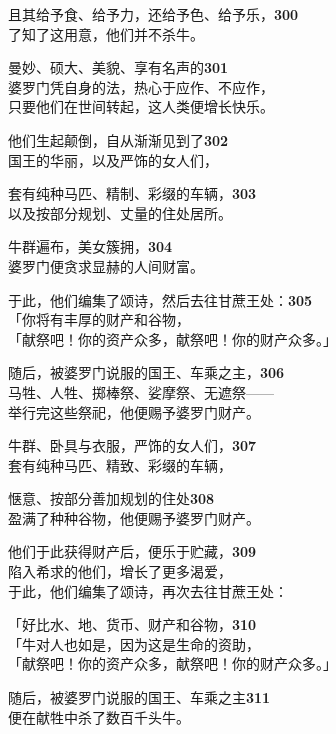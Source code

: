且其给予食、给予力，还给予色、给予乐，\hfill{\grayfootnotesize \textbf{300}} \\
了知了这用意，他们并不杀牛。


曼妙、硕大、美貌、享有名声的\hfill{\grayfootnotesize \textbf{301}} \\
婆罗门凭自身的法，热心于应作、不应作，\\
只要他们在世间转起，这人类便增长快乐。


他们生起颠倒，自从渐渐见到了\hfill{\grayfootnotesize \textbf{302}} \\
国王的华丽，以及严饰的女人们，


套有纯种马匹、精制、彩缀的车辆，\hfill{\grayfootnotesize \textbf{303}} \\
以及按部分规划、丈量的住处居所。


牛群遍布，美女簇拥，\hfill{\grayfootnotesize \textbf{304}} \\
婆罗门便贪求显赫的人间财富。


于此，他们编集了颂诗，然后去往甘蔗王处：\hfill{\grayfootnotesize \textbf{305}} \\
「你将有丰厚的财产和谷物，\\
「献祭吧！你的资产众多，献祭吧！你的财产众多。」


随后，被婆罗门说服的国王、车乘之主，\hfill{\grayfootnotesize \textbf{306}} \\
马牲、人牲、掷棒祭、娑摩祭、无遮祭——\\
举行完这些祭祀，他便赐予婆罗门财产。


牛群、卧具与衣服，严饰的女人们，\hfill{\grayfootnotesize \textbf{307}} \\
套有纯种马匹、精致、彩缀的车辆，


惬意、按部分善加规划的住处\hfill{\grayfootnotesize \textbf{308}} \\
盈满了种种谷物，他便赐予婆罗门财产。

他们于此获得财产后，便乐于贮藏，\hfill{\grayfootnotesize \textbf{309}} \\
陷入希求的他们，增长了更多渴爱，\\
于此，他们编集了颂诗，再次去往甘蔗王处：


「好比水、地、货币、财产和谷物，\hfill{\grayfootnotesize \textbf{310}} \\
「牛对人也如是，因为这是生命的资助，\\
「献祭吧！你的资产众多，献祭吧！你的财产众多。」


随后，被婆罗门说服的国王、车乘之主\hfill{\grayfootnotesize \textbf{311}} \\
便在献牲中杀了数百千头牛。


